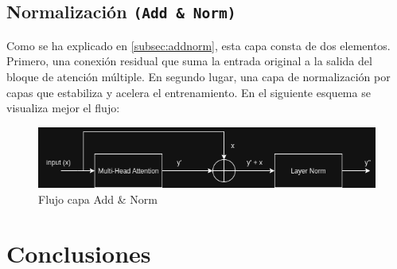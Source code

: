 \documentclass[11pt]{book}
\newcommand{\clearemptydoublepage}{\newpage{\pagestyle{empty}\cleardoublepage}}
\theoremstyle{plain}
\theoremstyle{definition}
\begin{document}
\section{Normalización \texttt{(Add \& Norm)}}
Como se ha explicado en \ref{subsec:addnorm}, esta capa consta de dos elementos. Primero, una conexión residual que suma la entrada original a la salida del bloque de atención múltiple. En segundo lugar, una capa de normalización por capas que estabiliza y acelera el entrenamiento. En el siguiente esquema se visualiza mejor el flujo: 

\begin{figure}[h]
    \centering
    \includegraphics[width=0.5\linewidth]{img/esquema1.png}
    \caption{Flujo capa Add \& Norm}
    \label{fig:placeholder14}
\end{figure}





\clearemptydoublepage

\chapter{Conclusiones}


\clearemptydoublepage

\printbibliography[title={Referencias Bibliográficas}]
\end{document}
